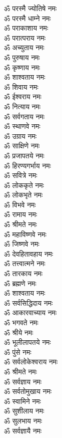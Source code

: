 \begin{multicols}{2}
\begin{flushleft}
ॐ परस्मै ज्योतिषे नमः\\
ॐ परस्मै धाम्ने नमः\\
ॐ पराकाशाय नमः\\
ॐ परात्पराय नमः\\
ॐ अच्युताय नमः\\
ॐ पुरुषाय नमः\\
ॐ कृष्णाय नमः\hfill{}\\
ॐ शाश्वताय नमः\\
ॐ शिवाय नमः\\
ॐ ईश्वराय नमः\\
ॐ नित्याय नमः\\
ॐ सर्वगताय नमः\\
ॐ स्थाणवे नमः\\
ॐ उग्राय नमः\\
ॐ साक्षिणे नमः\\
ॐ प्रजापतये नमः\\
ॐ हिरण्यगर्भाय नमः\hfill{}\\
ॐ सवित्रे नमः\\
ॐ लोककृते नमः\\
ॐ लोकभृते नमः\\
ॐ विभवे नमः\\
ॐ रामाय नमः\\
ॐ श्रीमते नमः\\
ॐ महाविष्णवे नमः\\
ॐ जिष्णवे नमः\\
ॐ देवहितावहाय नमः\\
ॐ तत्त्वात्मने नमः\hfill{}\\
ॐ तारकाय नमः\\
ॐ ब्रह्मणे नमः\\
ॐ शाश्वताय नमः\\
ॐ सर्वसिद्धिदाय नमः\\
ॐ आकारवाच्याय नमः\\
ॐ भगवते नमः\\
ॐ श्रीये नमः\\
ॐ भूलीलापतये नमः\\
ॐ पुंसे नमः\\
ॐ सर्वलोकेश्वराय नमः\hfill{}\\
ॐ श्रीमते नमः\\
ॐ सर्वज्ञाय नमः\\
ॐ सर्वतोमुखाय नमः\\
ॐ स्वामिने नमः\\
ॐ सुशीलाय नमः\\
ॐ सुलभाय नमः\\
ॐ सर्वज्ञायै नमः\\

\end{flushleft}
\end{multicols}
